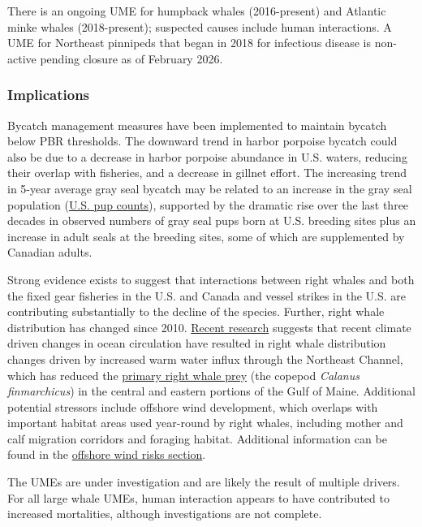 \documentclass[
  10pt,
]{article}
\begin{document}
There is an ongoing UME for humpback whales (2016-present) and Atlantic
minke whales (2018-present); suspected causes include human
interactions. A UME for Northeast pinnipeds that began in 2018 for
infectious disease is non-active pending closure as of February 2026.

\subsubsection{Implications}\label{implications-4}

Bycatch management measures have been implemented to maintain bycatch
below PBR thresholds. The downward trend in harbor porpoise bycatch
could also be due to a decrease in harbor porpoise abundance in U.S.
waters, reducing their overlap with fisheries, and a decrease in gillnet
effort. The increasing trend in 5-year average gray seal bycatch may be
related to an increase in the gray seal population
(\href{https://noaa-edab.github.io/catalog/seal_pups.html}{U.S. pup
counts}), supported by the dramatic rise over the last three decades in
observed numbers of gray seal pups born at U.S. breeding sites plus an
increase in adult seals at the breeding sites, some of which are
supplemented by Canadian adults.

Strong evidence exists to suggest that interactions between right whales
and both the fixed gear fisheries in the U.S. and Canada and vessel
strikes in the U.S. are contributing substantially to the decline of the
species. Further, right whale distribution has changed since 2010.
\href{https://noaa-edab.github.io/catalog/narw.html}{Recent research}
suggests that recent climate driven changes in ocean circulation have
resulted in right whale distribution changes driven by increased warm
water influx through the Northeast Channel, which has reduced the
\href{https://noaa-edab.github.io/catalog/preyfield_energy.html}{primary
right whale prey} (the copepod \emph{Calanus finmarchicus}) in the
central and eastern portions of the Gulf of Maine. Additional potential
stressors include offshore wind development, which overlaps with
important habitat areas used year-round by right whales, including
mother and calf migration corridors and foraging habitat. Additional
information can be found in the
\hyperref[other-ocean-uses-offshore-wind]{offshore wind risks section}.

The UMEs are under investigation and are likely the result of multiple
drivers. For all large whale UMEs, human interaction appears to have
contributed to increased mortalities, although investigations are not
complete.
\end{document}
